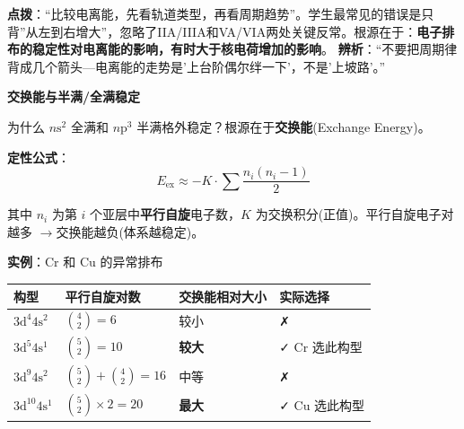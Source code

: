 \documentclass[a4paper,11pt]{ctexart}
\newcounter{none}
\newcommand{\箭}{\ensuremath{\rightarrow}}
\newcommand{\左箭}{\ensuremath{\leftarrow}}
\newcommand{\上箭}{\ensuremath{\uparrow}}
\newcommand{\下箭}{\ensuremath{\downarrow}}
\newcommand{\衡}{\ensuremath{\rightleftharpoons}}
\newcommand{\双箭}{\ensuremath{\leftrightarrow}}
\newcommand{\约等于}{\ensuremath{\approx}}
\newcommand{\小于等于}{\ensuremath{\leq}}
\newcommand{\大于等于}{\ensuremath{\geq}}
\newcommand{\不等于}{\ensuremath{\neq}}
\newcommand{\西格马}{\ensuremath{\sigma}}
\newcommand{\派}{\ensuremath{\pi}}
\begin{document}
\textbf{点拨}：``比较电离能，先看轨道类型，再看周期趋势''。学生最常见的错误是只背''从左到右增大''，忽略了IIA/IIIA和VA/VIA两处关键反常。根源在于：\textbf{电子排布的稳定性对电离能的影响，有时大于核电荷增加的影响}。
\textbf{辨析}：``不要把周期律背成几个箭头---电离能的走势是'上台阶偶尔绊一下'，不是'上坡路'。''

\textbf{交换能与半满/全满稳定}

为什么 \(n\mathrm{s}^2\) 全满和 \(n\mathrm{p}^3\) 半满格外稳定？根源在于\textbf{交换能}(Exchange Energy)。

\textbf{定性公式}：
\[E_{\text{ex}} \approx -K \cdot \sum \frac{n_i(n_i-1)}{2}\]

其中 \(n_i\) 为第 \(i\) 个亚层中\textbf{平行自旋}电子数，\(K\) 为交换积分(正值)。平行自旋电子对越多 \箭 交换能越负(体系越稳定)。

\textbf{实例}：Cr 和 Cu 的异常排布

{\def\LTcaptype{none} %
\begin{longtable}[]{@{}
  >{\centering\arraybackslash}p{}
  >{\centering\arraybackslash}p{}
  >{\centering\arraybackslash}p{}
  >{\centering\arraybackslash}p{}@{}}
\toprule\noalign{}
\begin{minipage}[b]{\linewidth}\centering
构型
\end{minipage} & \begin{minipage}[b]{\linewidth}\centering
平行自旋对数
\end{minipage} & \begin{minipage}[b]{\linewidth}\centering
交换能相对大小
\end{minipage} & \begin{minipage}[b]{\linewidth}\centering
实际选择
\end{minipage} \\
\midrule\noalign{}
\endhead
\bottomrule\noalign{}
\endlastfoot
\(3\mathrm{d}^4 4\mathrm{s}^2\) & \(\binom{4}{2}=6\) & 较小 & ✗ \\
\(3\mathrm{d}^5 4\mathrm{s}^1\) & \(\binom{5}{2}=10\) & \textbf{较大} & ✓ Cr 选此构型 \\
\(3\mathrm{d}^9 4\mathrm{s}^2\) & \(\binom{5}{2}+\binom{4}{2}=16\) & 中等 & ✗ \\
\(3\mathrm{d}^{10} 4\mathrm{s}^1\) & \(\binom{5}{2}\times2=20\) & \textbf{最大} & ✓ Cu 选此构型 \\
\end{longtable}
}
\end{document}
